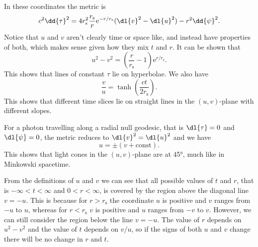 \documentclass[fleqn]{NotesClass}
\newcommand*{\e}{\mathrm{e}}
\begin{document}
    In these coordinates the metric is
    \begin{equation}
        c^2\dd{\tau}^2 = 4r_{\mathrm{s}}^2 \frac{r_{\mathrm{s}}}{r} \e^{-r/r_{\mathrm{s}}} (\dl{v}^2 - \dl{u}^2) - r^2\dd{\psi}^2.
    \end{equation}
    Notice that \(u\) and \(v\) aren't clearly time or space like, and instead have properties of both, which makes sense given how they mix \(t\) and \(r\).
    It can be shown that
    \begin{equation}
        u^2 - v^2 = \left( \frac{r}{r_{\mathrm{s}}} - 1 \right)\e^{r/r_{\mathrm{s}}}.
    \end{equation}
    This shows that lines of constant \(\tau\) lie on hyperbolae.
    We also have
    \begin{equation}
        \frac{v}{u} = \tanh\left( \frac{ct}{2r_{\mathrm{s}}} \right).
    \end{equation}
    This shows that different time slices lie on straight lines in the \((u, v)\)-plane with different slopes.
    
    For a photon travelling along a radial null geodesic, that is \(\dl{\tau} = 0\) and \(\dl{\psi} = 0\), the metric reduces to \(\dl{v}^2 = \dl{u}^2\) and we have
    \begin{equation}
        u = \pm (v + \mathrm{const}).
    \end{equation}
    This shows that light cones in the \((u, v)\)-plane are at \ang{45}, much like in Minkowski spacetime.
    
    From the definitions of \(u\) and \(v\) we can see that all possible values of \(t\) and \(r\), that is \(-\infty < t < \infty\) and \(0 < r < \infty\), is covered by the region above the diagonal line \(v = -u\).
    This is because for \(r > r_{\mathrm{s}}\) the coordinate \(u\) is positive and \(v\) ranges from \(-u\) to \(u\), whereas for \(r < r_{\mathrm{s}}\) \(v\) is positive and \(u\) ranges from \(-v\) to \(v\).
    However, we can still consider the region below the line \(v = -u\).
    The value of \(r\) depends on \(u^2 - v^2\) and the value of \(t\) depends on \(v/u\), so if the signs of both \(u\) and \(v\) change there will be no change in \(r\) and \(t\).
    
\end{document}
